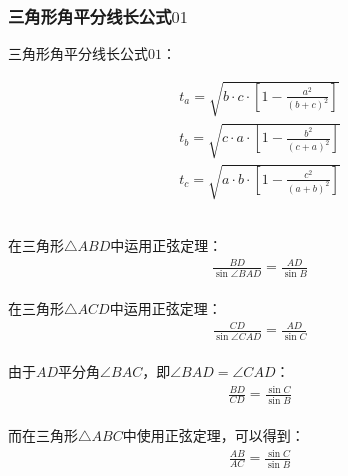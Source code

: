 \documentclass[UTF8]{ctexart}
\begin{document}
\subsubsection{三角形角平分线长公式$01$}
    三角形角平分线长公式$01$：
    \begin{large}
        \begin{align*}
            t_a=\sqrt{b\cdot c\cdot\left[1-\frac{a^2}{(b+c)^2}\right]}\\[3mm]
            t_b=\sqrt{c\cdot a\cdot\left[1-\frac{b^2}{(c+a)^2}\right]}\\[3mm]
            t_c=\sqrt{a\cdot b\cdot\left[1-\frac{c^2}{(a+b)^2}\right]}
        \end{align*}
    \end{large}\\
    在三角形$\triangle ABD$中运用正弦定理：
    \setcounter{equation}{0}
    \begin{align}
        \frac{BD}{\sin{\angle BAD}}=\frac{AD}{\sin{B}}
    \end{align}\\
    在三角形$\triangle ACD$中运用正弦定理：
    \begin{align}
        \frac{CD}{\sin{\angle CAD}}=\frac{AD}{\sin{C}}
    \end{align}\\
    由于$AD$平分角$\angle BAC$，即$\angle BAD=\angle CAD$：\vspace{3pt}
    \begin{align}
        \frac{BD}{CD}=\frac{\sin{C}}{\sin{B}}
    \end{align}\\
    而在三角形$\triangle ABC$中使用正弦定理，可以得到：\vspace{3pt}
    \begin{align}
        \frac{AB}{AC}=\frac{\sin{C}}{\sin{B}}
    \end{align}
\end{document}
